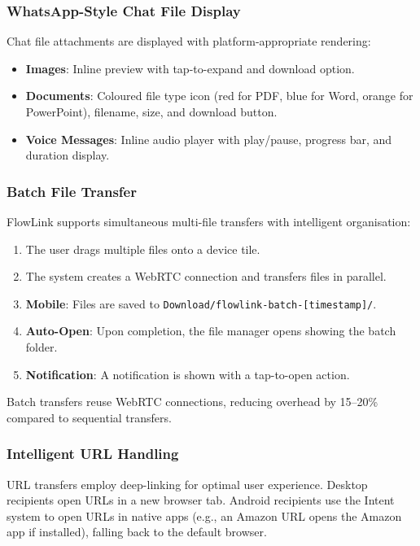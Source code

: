 \documentclass[conference]{IEEEtran}
\begin{document}
\subsubsection{WhatsApp-Style Chat File Display}

Chat file attachments are displayed with platform-appropriate rendering:
\begin{itemize}
    \item \textbf{Images}: Inline preview with tap-to-expand and download option.
    \item \textbf{Documents}: Coloured file type icon (red for PDF, blue for Word, orange for PowerPoint), filename, size, and download button.
    \item \textbf{Voice Messages}: Inline audio player with play/pause, progress bar, and duration display.
\end{itemize}

\subsubsection{Batch File Transfer}

FlowLink supports simultaneous multi-file transfers with intelligent organisation:
\begin{enumerate}
    \item The user drags multiple files onto a device tile.
    \item The system creates a WebRTC connection and transfers files in parallel.
    \item \textbf{Mobile}: Files are saved to \texttt{Download/flowlink-batch-[timestamp]/}.
    \item \textbf{Auto-Open}: Upon completion, the file manager opens showing the batch folder.
    \item \textbf{Notification}: A notification is shown with a tap-to-open action.
\end{enumerate}

Batch transfers reuse WebRTC connections, reducing overhead by 15--20\% compared to sequential transfers.

\subsubsection{Intelligent URL Handling}

URL transfers employ deep-linking for optimal user experience. Desktop recipients open URLs in a new browser tab. Android recipients use the Intent system to open URLs in native apps (e.g., an Amazon URL opens the Amazon app if installed), falling back to the default browser.
\end{document}
